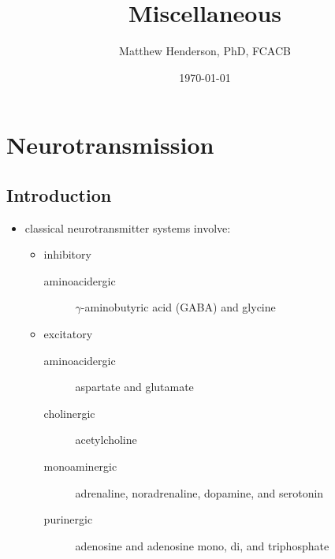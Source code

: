 \documentclass[12pt]{scrartcl}
\author{Matthew Henderson, PhD, FCACB}
\date{\today}
\title{Miscellaneous}
\begin{document}
\maketitle
\setcounter{tocdepth}{2}
\tableofcontents



\section{Neurotransmission}
\label{sec:org3642ead}
\subsection{Introduction}
\label{sec:orgec18c34}
\begin{itemize}
\item classical neurotransmitter systems involve:
\begin{itemize}
\item inhibitory
\begin{description}
\item[{aminoacidergic}] \(\gamma\)-aminobutyric acid (GABA) and glycine
\end{description}
\item excitatory
\begin{description}
\item[{aminoacidergic}] aspartate and glutamate
\item[{cholinergic}] acetylcholine
\item[{monoaminergic}] adrenaline, noradrenaline, dopamine, and serotonin
\item[{purinergic}] adenosine and adenosine mono, di, and triphosphate
\end{description}
\end{itemize}


\end{itemize}
\end{document}
